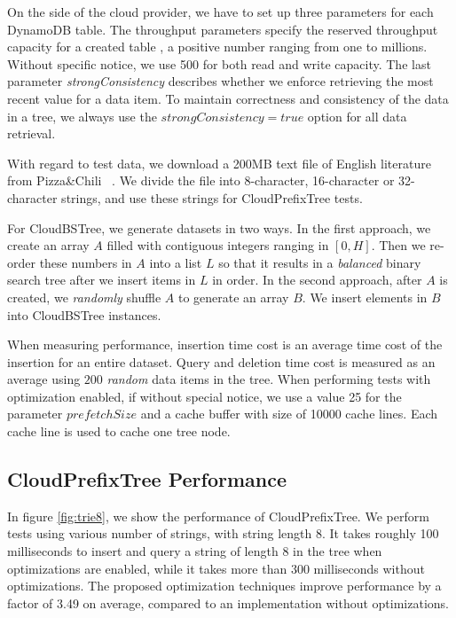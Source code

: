 \documentclass[10pt, conference, compsocconf]{IEEEtran}
\begin{document}
On the side of the cloud provider, we have to set up three parameters for each DynamoDB table.
The throughput parameters specify the reserved throughput capacity for a created table  \cite{RWCapacity},
a positive number ranging from one to millions. Without specific notice, we use 500 for both read and write capacity.
The last parameter \emph{strongConsistency} describes whether we 
enforce retrieving the most recent value for a data item. To maintain correctness and consistency of the data in a tree,
we always use the $strongConsistency = true$ option for all data retrieval.

With regard to test data, we download a 200MB text file of English literature from Pizza\&Chili~\footnotemark
{}. We divide the file into 8-character, 16-character or 32-character strings,
and use these strings for CloudPrefixTree tests. 

For CloudBSTree, 
we generate datasets in two ways. In the first approach, we create an array $A$ filled with contiguous integers ranging in $[0, H]$.
Then we re-order these numbers in $A$ into a list $L$ so that it results in a \emph{balanced} binary search tree after 
we insert items in $L$ in order.  
In the second approach,
after $A$ is created, we \emph{randomly} shuffle $A$ to generate an array $B$.
We insert elements in $B$ into CloudBSTree instances. 

When measuring performance, insertion time cost is an average time cost of the insertion for an entire dataset.
Query and deletion time cost is measured as an average using $200$ \emph{random} data items in the tree.
When performing tests with optimization enabled, if without special notice,
we use a value 25 for  the parameter $prefetchSize$ and a cache buffer with size of 10000 cache lines.
Each cache line is used to cache one tree node.


\subsection{CloudPrefixTree Performance}
In figure \ref{fig:trie8}, we show the performance of CloudPrefixTree.
We perform tests using various number of strings, with string length 8.
It takes roughly 100 milliseconds to insert and query a string of length 8 in the tree 
when optimizations are enabled, while it takes more than 300 milliseconds without optimizations. 
The proposed optimization techniques improve performance by a factor of 3.49 on average,
compared to an implementation without optimizations.
\end{document}
